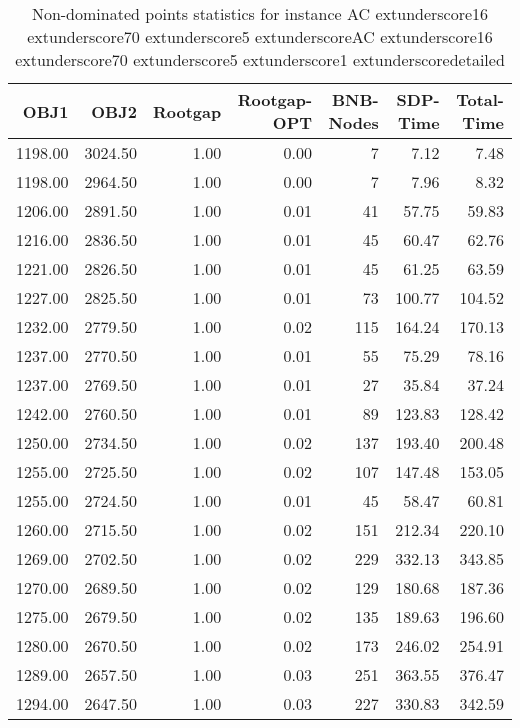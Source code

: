 \begin{table}
\caption{Non-dominated points statistics for instance AC	extunderscore16	extunderscore70	extunderscore5	extunderscoreAC	extunderscore16	extunderscore70	extunderscore5	extunderscore1	extunderscoredetailed}
\label{tab:stats/AC_16_70_5_AC_16_70_5_1_detailed}
\begin{tabular}{rrrrrrr}
\toprule
OBJ1 & OBJ2 & Rootgap & Rootgap-OPT & BNB-Nodes & SDP-Time & Total-Time \\
\midrule
1198.00 & 3024.50 & 1.00 & 0.00 & 7 & 7.12 & 7.48 \\
1198.00 & 2964.50 & 1.00 & 0.00 & 7 & 7.96 & 8.32 \\
1206.00 & 2891.50 & 1.00 & 0.01 & 41 & 57.75 & 59.83 \\
1216.00 & 2836.50 & 1.00 & 0.01 & 45 & 60.47 & 62.76 \\
1221.00 & 2826.50 & 1.00 & 0.01 & 45 & 61.25 & 63.59 \\
1227.00 & 2825.50 & 1.00 & 0.01 & 73 & 100.77 & 104.52 \\
1232.00 & 2779.50 & 1.00 & 0.02 & 115 & 164.24 & 170.13 \\
1237.00 & 2770.50 & 1.00 & 0.01 & 55 & 75.29 & 78.16 \\
1237.00 & 2769.50 & 1.00 & 0.01 & 27 & 35.84 & 37.24 \\
1242.00 & 2760.50 & 1.00 & 0.01 & 89 & 123.83 & 128.42 \\
1250.00 & 2734.50 & 1.00 & 0.02 & 137 & 193.40 & 200.48 \\
1255.00 & 2725.50 & 1.00 & 0.02 & 107 & 147.48 & 153.05 \\
1255.00 & 2724.50 & 1.00 & 0.01 & 45 & 58.47 & 60.81 \\
1260.00 & 2715.50 & 1.00 & 0.02 & 151 & 212.34 & 220.10 \\
1269.00 & 2702.50 & 1.00 & 0.02 & 229 & 332.13 & 343.85 \\
1270.00 & 2689.50 & 1.00 & 0.02 & 129 & 180.68 & 187.36 \\
1275.00 & 2679.50 & 1.00 & 0.02 & 135 & 189.63 & 196.60 \\
1280.00 & 2670.50 & 1.00 & 0.02 & 173 & 246.02 & 254.91 \\
1289.00 & 2657.50 & 1.00 & 0.03 & 251 & 363.55 & 376.47 \\
1294.00 & 2647.50 & 1.00 & 0.03 & 227 & 330.83 & 342.59 \\
\bottomrule
\end{tabular}
\end{table}

